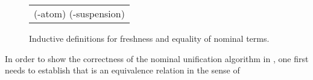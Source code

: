 \begin{isabellebody}
\begin{isamarkuptext}
\begin{figure}[t]
\begin{center}
\begin{tabular}{c}
  \isa{\mbox{}\inferrule{\mbox{}}{\mbox{\ {\isaliteral{5C3C6E61626C613E}{\isasymnabla}}\ {\isaliteral{5C3C7475726E7374696C653E}{\isasymturnstile}}\ a\ {\isaliteral{5C3C617070726F783E}{\isasymapprox}}\ a}}}(\isa{{\isaliteral{5C3C617070726F783E}{\isasymapprox}}}-atom)\hspace{5mm}
  \isa{\mbox{}\inferrule{\mbox{{\isaliteral{5C3C666F72616C6C3E}{\isasymforall}}c{\isaliteral{5C3C696E3E}{\isasymin}}ds\ {\isaliteral{5C3C70693E}{\isasympi}}\ {\isaliteral{5C3C70693E}{\isasympi}}{\isaliteral{27}{\isacharprime}}{\isaliteral{2E}{\isachardot}}\ {\isaliteral{28}{\isacharparenleft}}c{\isaliteral{2C}{\isacharcomma}}\ X{\isaliteral{29}{\isacharparenright}}\ {\isaliteral{5C3C696E3E}{\isasymin}}\ {\isaliteral{5C3C6E61626C613E}{\isasymnabla}}}}{\mbox{\ {\isaliteral{5C3C6E61626C613E}{\isasymnabla}}\ {\isaliteral{5C3C7475726E7374696C653E}{\isasymturnstile}}\ {\isaliteral{5C3C70693E}{\isasympi}}{\isaliteral{5C3C63646F743E}{\isasymcdot}}X\ {\isaliteral{5C3C617070726F783E}{\isasymapprox}}\ {\isaliteral{5C3C70693E}{\isasympi}}{\isaliteral{27}{\isacharprime}}{\isaliteral{5C3C63646F743E}{\isasymcdot}}X}}}(\isa{{\isaliteral{5C3C617070726F783E}{\isasymapprox}}}-suspension)  
  \end{tabular}
  \end{center}

  \caption{Inductive definitions for freshness and equality of nominal terms.\label{judgements}}
  \end{figure}


  In order to show the correctness of the nominal unification algorithm in \cite{UrbanPittsGabbay04}, 
  one first needs to establish that  is an equivalence relation in the sense of


\end{isamarkuptext}
\end{isabellebody}
